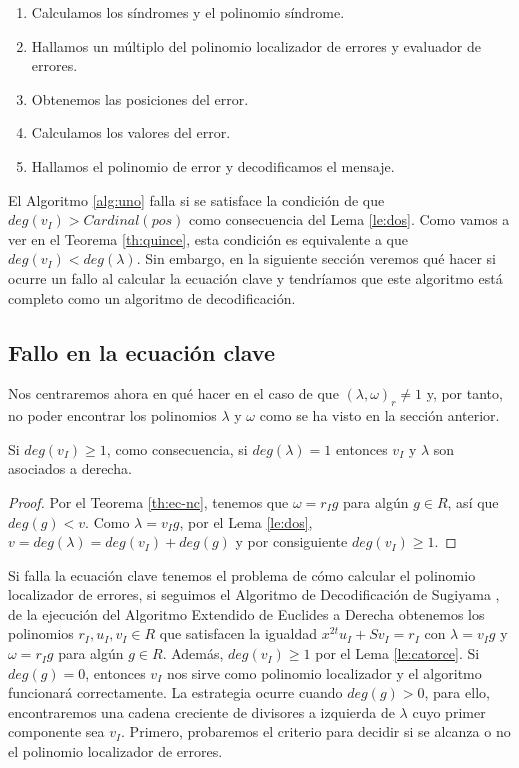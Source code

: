 \begin{enumerate}
    \item Calculamos los síndromes y el polinomio síndrome.
    \item Hallamos un múltiplo del polinomio localizador de errores y evaluador de errores.
    \item Obtenemos las posiciones del error.
    \item Calculamos los valores del error.
    \item Hallamos el polinomio de error y decodificamos el mensaje.
\end{enumerate}

\begin{remark}
    El Algoritmo \ref{alg:uno} falla si se satisface la condición de que $deg(v_I) > Cardinal(pos)$ como consecuencia del Lema \ref{le:dos}. Como vamos a ver en el Teorema \ref{th:quince}, esta condición es equivalente a que $deg(v_I) < deg(\lambda)$. Sin embargo, en la siguiente sección veremos qué hacer si ocurre un fallo al calcular la ecuación clave y tendríamos que este algoritmo está completo como un algoritmo de decodificación.
\end{remark}

\subsection{Fallo en la ecuación clave}

Nos centraremos ahora en qué hacer en el caso de que $(\lambda,\omega)_r \neq 1$ y, por tanto, no poder encontrar los polinomios $\lambda$ y $\omega$ como se ha visto en la sección anterior.

\begin{lemma}
\label{le:catorce}
Si $deg(v_I) \geq 1$, como consecuencia, si $deg(\lambda) = 1$ entonces $v_I$ y $\lambda$ son asociados a derecha.
\end{lemma}

\begin{proof}
    Por el Teorema \ref{th:ec-nc}, tenemos que $\omega = r_I g$ para algún $g \in R$, así que $deg(g) < v$. Como $\lambda = v_I g$, por el Lema \ref{le:dos}, $v = deg(\lambda) = deg(v_I)+deg(g)$ y por consiguiente $deg(v_I) \geq 1$.
\end{proof}

Si falla la ecuación clave tenemos el problema de cómo calcular el polinomio localizador de errores, si seguimos el Algoritmo de Decodificación de Sugiyama , de la ejecución del Algoritmo Extendido de Euclides a Derecha obtenemos los polinomios $r_I,u_I,v_I \in R$ que satisfacen la igualdad $x^{2t}u_I + Sv_I = r_I $ con $\lambda = v_I g$ y $\omega = r_I g$ para algún $g \in R$. Además, $deg(v_I) \geq 1$ por el Lema \ref{le:catorce}. Si $deg(g) = 0$, entonces $v_I$ nos sirve como polinomio localizador y el algoritmo funcionará correctamente. La estrategia ocurre cuando $deg(g) > 0$, para ello, encontraremos una cadena creciente de divisores a izquierda de $\lambda$ cuyo primer componente sea $v_I$. Primero, probaremos el criterio para decidir si se alcanza o no el polinomio localizador de errores.

